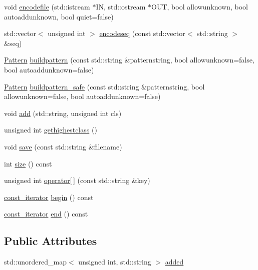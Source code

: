 \begin{DoxyCompactItemize}
void \hyperlink{classClassEncoder_a83e08eb6b43b6fceb95b0bdb1960348f}{encodefile} (std\+::istream $\ast$I\+N, std\+::ostream $\ast$O\+U\+T, bool allowunknown, bool autoaddunknown, bool quiet=false)
\item 
std\+::vector$<$ unsigned int $>$ \hyperlink{classClassEncoder_ae1c2529c9abd544f618c821067ee39c9}{encodeseq} (const std\+::vector$<$ std\+::string $>$ \&seq)
\item 
\hyperlink{classPattern}{Pattern} \hyperlink{classClassEncoder_ac517bd3fb8129c7a525479b015d91e01}{buildpattern} (const std\+::string \&patternstring, bool allowunknown=false, bool autoaddunknown=false)
\item 
\hyperlink{classPattern}{Pattern} \hyperlink{classClassEncoder_af65d2963df9698d6ff6a0740f506feae}{buildpattern\+\_\+safe} (const std\+::string \&patternstring, bool allowunknown=false, bool autoaddunknown=false)
\item 
void \hyperlink{classClassEncoder_a434fc52c64ec960ef68daba4889695d6}{add} (std\+::string, unsigned int cls)
\item 
unsigned int \hyperlink{classClassEncoder_a295adb48f47845aa5842c68b00b24b9a}{gethighestclass} ()
\item 
void \hyperlink{classClassEncoder_a171525ba62fd46cb8f79dcfbf1b39c7e}{save} (const std\+::string \&filename)
\item 
int \hyperlink{classClassEncoder_a0c31f09dbe100561e8690bb1fae5233c}{size} () const 
\item 
unsigned int \hyperlink{classClassEncoder_aa91eb6e8559c0483f973ffbd27aa6567}{operator\mbox{[}$\,$\mbox{]}} (const std\+::string \&key)
\item 
\hyperlink{classClassEncoder_afbc5a5bdbe889258e576f886a99e1427}{const\+\_\+iterator} \hyperlink{classClassEncoder_aa910e516cb3b8daae2c78bc7f03321f0}{begin} () const 
\item 
\hyperlink{classClassEncoder_afbc5a5bdbe889258e576f886a99e1427}{const\+\_\+iterator} \hyperlink{classClassEncoder_a88d4d147fb9d696cb076df6e0567066f}{end} () const 
\end{DoxyCompactItemize}
\subsection*{Public Attributes}
\begin{DoxyCompactItemize}
\item 
std\+::unordered\+\_\+map$<$ unsigned int, std\+::string $>$ \hyperlink{classClassEncoder_adcdcf6dc84a1c3ca056f3687b2d3688c}{added}
\end{DoxyCompactItemize}


